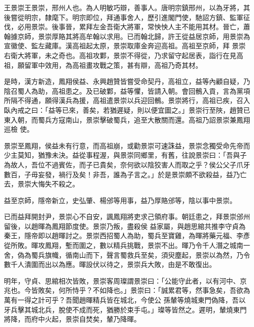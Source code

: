 
\begin{pinyinscope}

 王景崇王景崇，邢州人也。為人明敏巧辯，善事人。唐明宗鎮邢州，以為牙將，其後嘗從明宗，隸麾下。明宗即位，拜通事舍人，歷引進閣門使，馳詔方鎮、監軍征伐，必用景崇。後事晉，累拜左金吾衛大將軍，常怏怏人主不能用其材。晉亡，蕭翰據京師，景崇厚賂其將高牟翰以求用。已而翰北歸，許王從益居京師，用景崇為宣徽使、監左藏庫。漢高祖起太原，景崇取庫金奔迎高祖。高祖至京師，拜
 景崇右衛大將軍，未之奇也。高祖攻鄴，景崇不得從，乃求留守起居表，詣行在見高祖，願留軍中效用，為高祖畫攻戰之策，甚有辯，高祖乃奇其材。



 是時，漢方新造，鳳翔侯益、永興趙贊皆嘗受命契丹，高祖立，益等內顧自疑，乃陰召蜀人為助，高祖患之。及已破鄴，益等懼，皆請入朝。會回鶻入貢，言為黨項所隔不得通，願得漢兵為援，高祖遣景崇以兵迎回鶻。景崇將行，高祖已疾，召入臥內戒之曰：「益等已來，善矣，若猶遲疑，則以便宜圖之。」景崇行至陜，趙贊已東入朝，而蜀兵方寇南山，景崇擊破蜀兵，追至大散關而還。高祖乃詔景崇兼鳳翔巡檢
 使。



 景崇至鳳翔，侯益未有行意，而高祖崩，或勸景崇可速誅益，景崇念獨受命先帝而少主莫知，猶豫未決。益從事程渥，與景崇同鄉里，有舊，往說景崇曰：「吾與子為故人，吾位不過賓佐，而子已貴矣，奈何欲以陰狡害人而取之乎？侯公父子爪牙數百，子毋妄發，禍行及矣！非吾，誰為子言之。」於是景崇頗不欲殺益，益乃亡去，景崇大悔失不殺之。



 益至京師，隱帝新立，史弘肇、楊邠等用事，益乃厚賂邠等，陰以事中景崇。



 已而益拜開封尹，景崇心不自安，諷鳳翔將吏求己領府事。朝廷患之，拜景崇邠州留後，以趙暉為鳳翔節度使。景崇乃叛，盡殺侯
 益家屬，與趙思綰共推李守貞為秦王，隱帝即以趙暉討之。景崇西招蜀人為助，蜀兵至寶雞，為暉將藥元福、李彥從所敗。暉攻鳳翔，塹而圍之，數以精兵挑戰，景崇不出。暉乃令千人潛之城南一舍，偽為蜀兵旗幟，循南山而下，聲言蜀救兵至矣，須臾塵起，景崇以為然，乃令數千人潰圍而出以為應。暉設伏以待之，景崇兵大敗，由是不敢復出。



 明年，守貞、思綰相次皆敗，景崇客周璨謂景崇曰：「公能守此者，以有河中、京兆也。今皆敗矣，何所恃乎？不如降也。」景崇曰：「誠累君等，然事急矣，吾欲為萬有一得之計可乎？吾聞趙暉精兵皆在城北，今使公
 孫輦等燒城東門偽降，吾以牙兵擊其城北兵，脫使不成而死，猶勝於束手屯。」璨等皆然之。遲明，輦燒東門將降，而府中火起，景崇自焚矣，輦乃降暉。




\end{pinyinscope}
